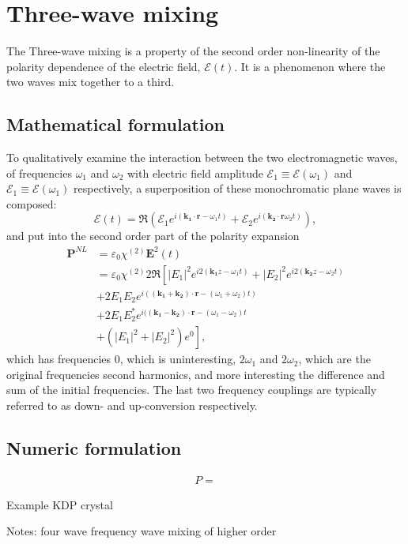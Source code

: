 \chapter{Three-wave mixing}
\label{cha:mixing}


The Three-wave mixing is a property of the second order non-linearity of the polarity dependence of the electric field, $\mathcal{E}(t)$. 
It is a phenomenon where the two waves mix together to a third. 



\section{Mathematical formulation}
\label{sec:mixing-math}

To qualitatively examine the interaction between the two electromagnetic waves, of frequencies $\omega_1$ and $\omega_2$ with electric field amplitude $\mathcal{E}_1  \equiv \mathcal{E}(\omega_1)$ and $\mathcal{E}_1  \equiv \mathcal{E}(\omega_1)$ respectively, a superposition of these monochromatic plane waves is composed: 
\[
\mathbf{\mathcal{E}}(t) = \Re (\mathcal{E}_1e^{i(\mathbf{k_1} \cdot \mathbf{r} - \omega_1 t)}+\mathcal{E}_2e^{i(\mathbf{k_2} \cdot \mathbf{r} \omega_2 t)}),
\]
and put into the second order part of the polarity expansion
\begin{align*}
     \mathbf{P}^{NL} & = \varepsilon_0 \chi^{(2)} \mathbf{E}^2(t) \\
&= \varepsilon_0 \chi^{(2)} 2 \Re \left[
|E_1|^2e^{i2(\mathbf{k_1} z - \omega_1t)}+|E_2|^2e^{i2(\mathbf{k_2} z - \omega_2t)} \right.\\
& +2E_1E_2e^{i((\mathbf{k_1} + \mathbf{k_2}) \cdot \mathbf{r} - (\omega_1+\omega_2)t)}\\
& +2E_1E_2^*e^{i((\mathbf{k_1} - \mathbf{k_2}) \cdot \mathbf{r} - (\omega_1-\omega_2)t}\\
& \left.+\left(|E_1|^2+|E_2|^2\right)e^{0}\right],
\end{align*}
which has frequencies $0$, which is uninteresting, $2\omega_1$ and $2\omega_2$, which are the original frequencies second harmonics, and more interesting the difference and sum of the initial frequencies. The last two frequency couplings are typically referred to as down- and up-conversion respectively. 


\section{Numeric formulation}
\label{sec:mixing-numeric}

\begin{align}
P = 
\end{align}


Example KDP crystal

Notes:
four wave frequency wave mixing of higher order

